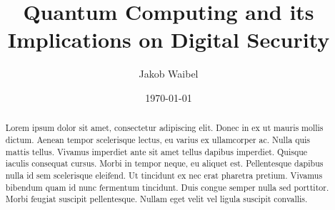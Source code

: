 \documentclass[aps,twocolumn,preprintnumbers]{revtex4}
\begin{document}
\title{Quantum Computing and its Implications on Digital Security}

\author{Jakob Waibel}


\date{\today}

\begin{abstract}
Lorem ipsum dolor sit amet, consectetur adipiscing elit. Donec in ex ut mauris mollis dictum. Aenean tempor scelerisque lectus, eu varius ex ullamcorper ac. Nulla quis mattis tellus. Vivamus imperdiet ante sit amet tellus dapibus imperdiet. Quisque iaculis consequat cursus. Morbi in tempor neque, eu aliquet est. Pellentesque dapibus nulla id sem scelerisque eleifend. Ut tincidunt ex nec erat pharetra pretium. Vivamus bibendum quam id nunc fermentum tincidunt. Duis congue semper nulla sed porttitor. Morbi feugiat suscipit pellentesque. Nullam eget velit vel ligula suscipit convallis.
\end{abstract}

\maketitle
\end{document}
